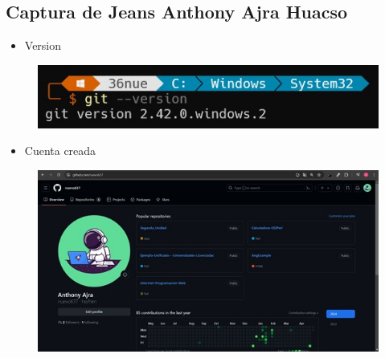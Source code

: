 \documentclass{article}
\begin{document}
	\subsection{Captura de Jeans Anthony Ajra Huacso}
	\begin{itemize}
		\item Version
	\end{itemize}
	\begin{figure}[H]
		\centering
		\includegraphics[width=1.0\textwidth,keepaspectratio]{img/AnthonyVersion.jpg}
	\end{figure}
	\begin{itemize}
		\item Cuenta creada
	\end{itemize}
	\begin{figure}[H]
		\centering
		\includegraphics[width=1.0\textwidth,keepaspectratio]{img/AnthonyCuenta.jpg}
	\end{figure}
	\clearpage
\end{document}

